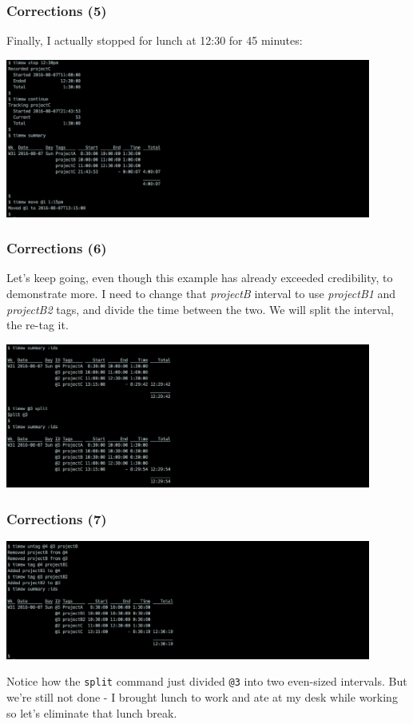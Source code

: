 \documentclass[t,handout]{beamer}
\begin{document}
\begin{frame}[fragile]\frametitle{Corrections (5)}
    \vfill
    Finally, I actually stopped for lunch at 12:30 for 45 minutes:

    \includegraphics[width=12cm]{images/tutorial41.png}
\end{frame}

\begin{frame}[fragile]\frametitle{Corrections (6)}
    \vfill
    Let's keep going, even though this example has already exceeded credibility, to demonstrate more. I need to change that \textit{projectB} interval to use \textit{projectB1} and \textit{projectB2} tags, and divide the time between the two. We will split the interval, the re-tag it.

    \includegraphics[width=12cm]{images/tutorial42a.png}
\end{frame}

\begin{frame}[fragile]\frametitle{Corrections (7)}
    \vfill
    \includegraphics[width=12cm]{images/tutorial42b.png}

    Notice how the \verb=split= command just divided \verb=@3= into two even-sized intervals. But we're still not done - I brought lunch to work and ate at my desk while working so let's eliminate that lunch break.
\end{frame}
\end{document}
